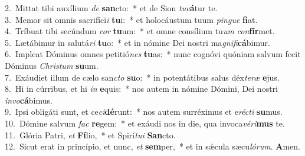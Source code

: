 {2.~}Mittat tibi auxílium \textit{de} \textbf{san}cto:~* et de Sion \textit{tu}\textit{e}\textbf{á}tur te.\\
{3.~}Memor sit omnis sacrifíci\textit{i} \textbf{tu}i:~* et holocáustum tuum \textit{pin}\textit{gue} \textbf{fi}at.\\
{4.~}Tríbuat tibi secúndum \textit{cor} \textbf{tu}um:~* et omne consílium tu\textit{um} \textit{con}\textbf{fír}met.\\
{5.~}Lætábimur in salutá\textit{ri} \textbf{tu}o:~* et in nómine Dei nostri ma\textit{gni}\textit{fi}\textbf{cá}bimur.\\
{6.~}Impleat Dóminus omnes petitió\textit{nes} \textbf{tu}as:~* nunc cognóvi quóniam salvum fecit Dóminus \textit{Chri}\textit{stum} \textbf{su}um.\\
{7.~}Exáudiet illum de cælo san\textit{cto} \textbf{su}o:~* in potentátibus salus déx\textit{te}\textit{ræ} \textbf{e}jus.\\
{8.~}Hi in cúrribus, et hi \textit{in} \textbf{e}quis:~* nos autem in nómine Dómini, Dei nostri \textit{in}\textit{vo}\textbf{cá}bimus.\\
{9.~}Ipsi obligáti sunt, et ce\textit{ci}\textbf{dé}runt:~* nos autem surréximus et e\textit{ré}\textit{cti} \textbf{su}mus.\\
{10.~}Dómine salvum \textit{fac} \textbf{re}gem:~* et exáudi nos in die, qua invoca\textit{vé}\textit{ri}\textbf{mus} te.\\
{11.~}Glória Patri, \textit{et} \textbf{Fí}lio,~* et Spirí\textit{tu}\textit{i} \textbf{San}cto.\\
{12.~}Sicut erat in princípio, et nunc, \textit{et} \textbf{sem}per,~* et in sǽcula sæcu\textit{ló}\textit{rum}. \textbf{A}men.\\
